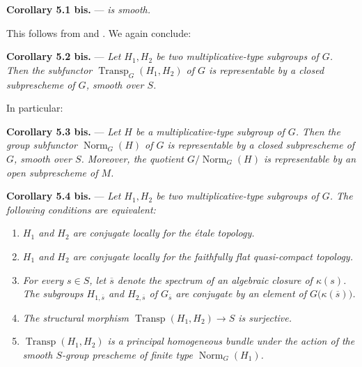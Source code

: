\medskip
\noindent{}\textbf{Corollary 5.1 bis.} ---
\textit{ is smooth.}

This follows from  and .  We again conclude:

\medskip
\noindent{}\textbf{Corollary 5.2 bis.} ---
\textit{Let \(H_1,H_2\) be two multiplicative-type subgroups of
\(G\).  Then the subfunctor
\(\operatorname{Transp}_G(H_1,H_2)\) of \(G\) is representable by a
closed subprescheme of \(G\), smooth over \(S\).}

In particular:

\medskip
\noindent{}\textbf{Corollary 5.3 bis.} ---
\textit{Let \(H\) be a multiplicative-type subgroup of \(G\).  Then
the group subfunctor \(\operatorname{Norm}_G(H)\) of \(G\) is
representable by a closed subprescheme of \(G\), smooth over \(S\).
Moreover, the quotient \(G/\operatorname{Norm}_G(H)\) is
representable by an open subprescheme of \(M\).}

\medskip
\noindent{}\textbf{Corollary 5.4 bis.} ---
\textit{Let \(H_1,H_2\) be two multiplicative-type subgroups of
\(G\).  The following conditions are equivalent:}

\begin{enumerate}
\item[(i)] 
\textit{\(H_1\) and \(H_2\) are conjugate locally for the étale
topology.}

\item[(i bis)] 
\textit{\(H_1\) and \(H_2\) are conjugate locally for the faithfully
flat quasi-compact topology.}

\item[(ii)] 
\textit{For every \(s\in S\), let \(\overline{s}\) denote the
spectrum of an algebraic closure of \(\kappa(s)\).  The subgroups
\(H_{1,\overline{s}}\) and \(H_{2,\overline{s}}\) of
\(G_{\overline{s}}\) are conjugate by an element of
\(G\bigl(\kappa(\overline{s})\bigr)\).}

\item[(ii bis)] 
\textit{The structural morphism
\(\operatorname{Transp}(H_1,H_2)\to S\) is surjective.}

\item[(iii)] 
\textit{\(\operatorname{Transp}(H_1,H_2)\) is a principal
homogeneous bundle under the action of the smooth \(S\)-group
prescheme of finite type \(\operatorname{Norm}_G(H_1)\).}
\end{enumerate}

